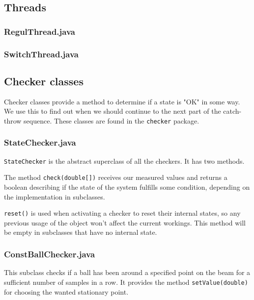 \subsection{Threads}

\subsubsection{RegulThread.java}

\subsubsection{SwitchThread.java}

\subsection{Checker classes}
Checker classes provide a method to determine if a state is "OK" in some way. We use this to find out when we should continue to the next part of the catch-throw sequence. These classes are found in the \texttt{checker} package.
\subsubsection{StateChecker.java}
\texttt{StateChecker} is the abstract superclass of all the checkers. It has two methods.

The method \texttt{check(double[])} receives our measured values and returns a boolean describing if the state of the system fulfills some condition, depending on the implementation in subclasses.

\texttt{reset()} is used when activating a checker to reset their internal states, so any previous usage of the object won't  affect the current workings. This method will be empty in subclasses that have no internal state.


\subsubsection{ConstBallChecker.java}
This subclass checks if a ball has been around a specified point on the beam for a sufficient number of samples in a row. It provides the method \texttt{setValue(double)} for choosing the wanted stationary point.

